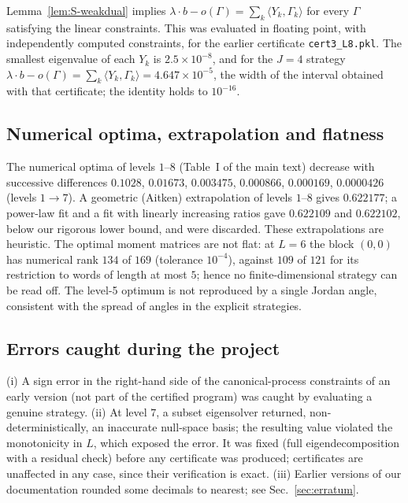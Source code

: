 \documentclass[aps,pra,onecolumn,notitlepage,superscriptaddress,longbibliography,nofootinbib,11pt]{revtex4-2}
\theoremstyle{remark}
\newcommand{\file}[1]{\texttt{#1}}
\begin{document}
Lemma~\ref{lem:S-weakdual} implies $\lambda\cdot b-o(\Gamma)=\sum_k\langle Y_k,\Gamma_k\rangle$ for every $\Gamma$ satisfying the linear constraints. This was evaluated in floating point, with independently computed constraints, for the earlier certificate \file{cert3\_L8.pkl}. The smallest eigenvalue of each $Y_k$ is $2.5\times10^{-8}$, and for the $J=4$ strategy $\lambda\cdot b-o(\Gamma)=\sum_k\langle Y_k,\Gamma_k\rangle=4.647\times10^{-5}$, the width of the interval obtained with that certificate; the identity holds to $10^{-16}$.

\subsection{Numerical optima, extrapolation and flatness}

The numerical optima of levels $1$--$8$ (Table~I of the main text) decrease with successive differences $0.1028$, $0.01673$, $0.003475$, $0.000866$, $0.000169$, $0.0000426$ (levels $1\to7$). A geometric (Aitken) extrapolation of levels $1$--$8$ gives $0.622177$; a power-law fit and a fit with linearly increasing ratios gave $0.622109$ and $0.622102$, below our rigorous lower bound, and were discarded. These extrapolations are heuristic. The optimal moment matrices are not flat: at $L=6$ the block $(0,0)$ has numerical rank $134$ of $169$ (tolerance $10^{-4}$), against $109$ of $121$ for its restriction to words of length at most $5$; hence no finite-dimensional strategy can be read off. The level-5 optimum is not reproduced by a single Jordan angle, consistent with the spread of angles in the explicit strategies.

\subsection{Errors caught during the project}

(i) A sign error in the right-hand side of the canonical-process constraints of an early version (not part of the certified program) was caught by evaluating a genuine strategy. (ii) At level $7$, a subset eigensolver returned, non-deterministically, an inaccurate null-space basis; the resulting value violated the monotonicity in $L$, which exposed the error. It was fixed (full eigendecomposition with a residual check) before any certificate was produced; certificates are unaffected in any case, since their verification is exact. (iii) Earlier versions of our documentation rounded some decimals to nearest; see Sec.~\ref{sec:erratum}.
\end{document}
